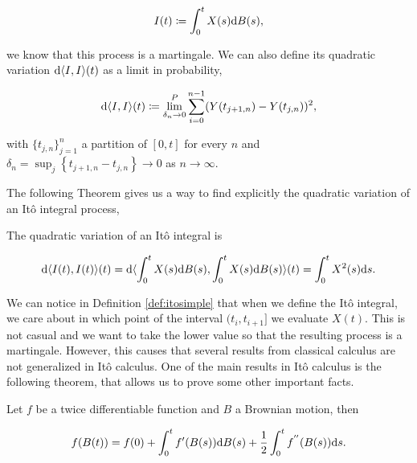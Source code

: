     \begin{equation*}
        I(t) \coloneqq \int_0^t X(s) \mathrm d B(s),
    \end{equation*}

\noindent we know that this process is a martingale. We can also define its quadratic variation $\mathrm d \langle I,I \rangle(t)$ as a limit in probability,

    \begin{equation*}
        \mathrm d \langle I,I \rangle(t) \coloneqq \lim^P_{\delta_n \to 0} \sum_{i=0}^{n-1} ( Y(t_{j+1,n}) - Y(t_{j,n}) )^2,
    \end{equation*}

    \noindent with $\{t_{j,n}\}_{j=1}^n$ a partition of $[0,t]$ for every $n$ and $\delta_n = \sup_j \left\{ t_{j+1,n} - t_{j,n} \right\} \to 0$ as $n\to \infty$.
    
    The following Theorem gives us a way to find explicitly the quadratic variation of an Itô integral process,

\begin{theorem}
    The quadratic variation of an Itô integral is

    \begin{equation*}
        \mathrm d \langle I(t),I(t)\rangle(t) = \mathrm d \langle \int_0^t X(s) \mathrm d B(s), \int_0^t X(s) \mathrm d B(s) \rangle(t) = \int_0^t X^2(s) \mathrm d s.
    \end{equation*}
\end{theorem}

We can notice in Definition \ref{def:itosimple} that when we define the Itô integral, we care about in which point of the interval $(t_{i},t_{i+1}]$ we evaluate $X(t)$. This is not casual and we want to take the lower value so that the resulting process is a martingale. However, this causes that several results from classical calculus are not generalized in Itô calculus. One of the main results in Itô calculus is the following theorem, that allows us to prove some other important facts.

\begin{theorem} \label{thm:ito_formula_brownian}
    Let $f$ be a twice differentiable function and $B$ a Brownian motion, then

    \begin{equation*}
        f(B(t)) = f(0) + \int_0^t f'(B(s)) \mathrm d B(s) + \frac12 \int_0^t f^{''}(B(s)) \mathrm d s.
    \end{equation*}
\end{theorem}

